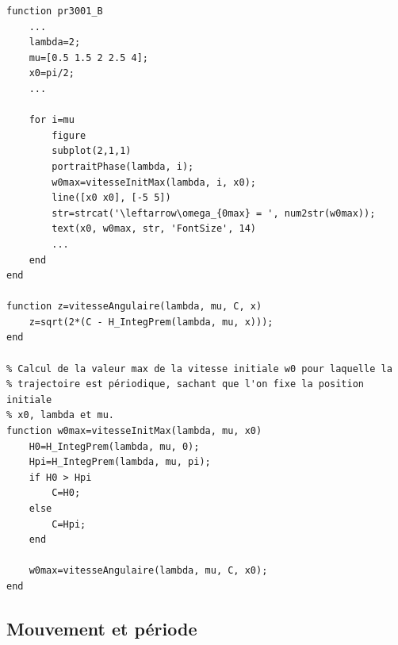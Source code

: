 \documentclass[11pt]{article}
\begin{document}
\begin{lstlisting}
function pr3001_B
    ...
    lambda=2;
    mu=[0.5 1.5 2 2.5 4];
    x0=pi/2;
    ...

    for i=mu
        figure
        subplot(2,1,1)
        portraitPhase(lambda, i);
        w0max=vitesseInitMax(lambda, i, x0);
        line([x0 x0], [-5 5])
        str=strcat('\leftarrow\omega_{0max} = ', num2str(w0max));
        text(x0, w0max, str, 'FontSize', 14)
        ...
    end
end

function z=vitesseAngulaire(lambda, mu, C, x)
    z=sqrt(2*(C - H_IntegPrem(lambda, mu, x)));
end

% Calcul de la valeur max de la vitesse initiale w0 pour laquelle la
% trajectoire est périodique, sachant que l'on fixe la position initiale
% x0, lambda et mu.
function w0max=vitesseInitMax(lambda, mu, x0)
    H0=H_IntegPrem(lambda, mu, 0);
    Hpi=H_IntegPrem(lambda, mu, pi);
    if H0 > Hpi
        C=H0;
    else
        C=Hpi;
    end

    w0max=vitesseAngulaire(lambda, mu, C, x0);
end
\end{lstlisting}
\newpage

\subsection{Mouvement et période}
\end{document}
